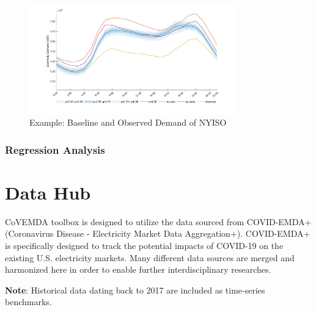 \documentclass[10pt]{article}
\newcommand{\covemda}{CoVEMDA}
\numberwithin{equation}{section}
\numberwithin{table}{section}
\numberwithin{figure}{section}
\begin{document}
\begin{figure}
  \centering
  \noindent\includegraphics[width=0.8\textwidth]{figures/example_backcast.jpg}
  \caption{Example: Baseline and Observed Demand of NYISO} \label{fig:backcast_eg}
\end{figure}



\subsubsection{Regression Analysis}



\clearpage
\section{Data Hub} \label{sec:datahub}
\covemda{} toolbox is designed to utilize the data sourced from COVID-EMDA+ (Coronavirus Disease - Electricity Market Data Aggregation+). COVID-EMDA+ is specifically designed to track the potential impacts of COVID-19 on the existing U.S. electricity markets. Many different data sources are merged and harmonized here in order to enable further interdisciplinary researches. 

\textbf{Note}: Historical data dating back to 2017 are included as time-series benchmarks.
\end{document}
